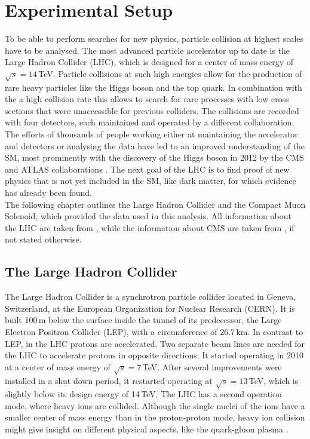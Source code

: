 \chapter{Experimental Setup}
\label{chap:expsetup}
To be able to perform searches for new physics, particle collision at highest scales have to be analysed. The most advanced particle accelerator up to date is the Large Hadron Collider (LHC), which is designed for a center of mass energy of $\sqrt{s}= 14$\,TeV. Particle collisions at such high energies allow for the production of rare heavy particles like the Higgs boson and the top quark. In combination with the a high collision rate this allows to search for rare processes with low cross sections that were unaccessible for previous colliders. The collisions are recorded with four detectors, each maintained and operated by a different collaboration. The efforts of thousands of people working either at maintaining the accelerator and detectors or analysing the data have led to an improved understanding of the SM, most prominently with the discovery of the Higgs boson in 2012 by the CMS \cite{cms_higgsdiscov} and ATLAS collaborations \cite{atlas_higgsdiscov}. The next goal of the LHC is to find proof of new physics that is not yet included in the SM, like dark matter, for which evidence has already been found.\\

\noindent The following chapter outlines the Large Hadron Collider and the Compact Muon Solenoid, which provided the data used in this analysis. All information about the LHC are taken from \cite{lhc_machine}, while the information about CMS are taken from \cite{CMS_design,strip_fig}, if not stated otherwise.

\section{The Large Hadron Collider}
The Large Hadron Collider is a synchrotron particle collider located in Geneva, Switzerland, at the European Organization for Nuclear Research (CERN). It is built 100\,m below the surface inside the tunnel of its predecessor, the Large Electron Positron Collider (LEP), with a circumference of 26.7\,km. In contrast to LEP, in the LHC protons are accelerated. Two separate beam lines are needed for the LHC to accelerate protons in opposite directions. It started operating in 2010 at a center of mass energy of $\sqrt{s}=7$\,TeV. After several improvements were installed in a shut down period, it restarted operating at $\sqrt{s}=13$\,TeV, which is slightly below its design energy of 14\,TeV. The LHC has a second operation mode, where heavy ions are collided. Although the single nuclei of the ions have a smaller center of mass energy than in the proton-proton mode, heavy ion collision might give insight on different physical aspects, like the quark-gluon plasma \cite{quarkgluonplasma}.\\

